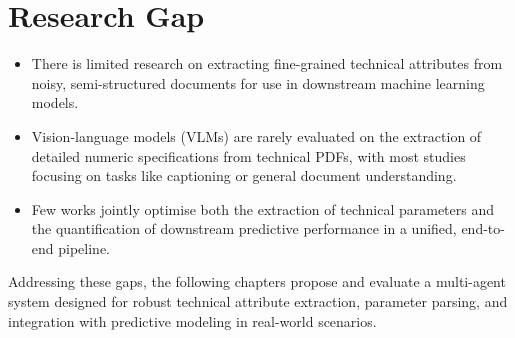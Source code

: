 \section{Research Gap}
\begin{itemize}
  \item There is limited research on extracting fine-grained technical attributes from noisy, semi-structured documents for use in downstream machine learning models.
  \item Vision-language models (VLMs) are rarely evaluated on the extraction of detailed numeric specifications from technical PDFs, with most studies focusing on tasks like captioning or general document understanding.
  \item Few works jointly optimise both the extraction of technical parameters and the quantification of downstream predictive performance in a unified, end-to-end pipeline.
\end{itemize}
Addressing these gaps, the following chapters propose and evaluate a multi-agent system designed for robust technical attribute extraction, parameter parsing, and integration with predictive modeling in real-world scenarios.

